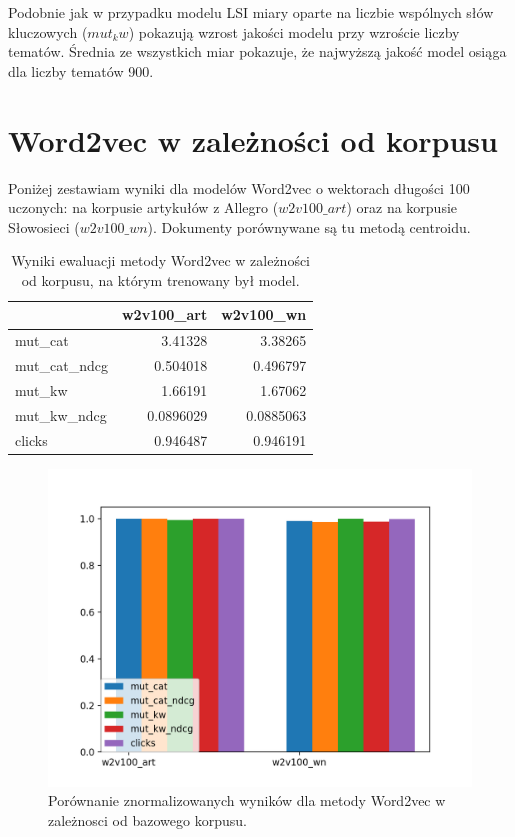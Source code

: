 \documentclass[pl]{minipw} %
\begin{document}
Podobnie jak w przypadku modelu LSI miary oparte na liczbie wspólnych słów kluczowych ($mut_kw$) pokazują wzrost jakości modelu przy wzroście liczby tematów. Średnia ze wszystkich miar pokazuje, że najwyższą jakość model osiąga dla liczby tematów 900.


\section{Word2vec w zależności od korpusu}

Poniżej zestawiam wyniki dla modelów Word2vec o wektorach długości 100 uczonych: na korpusie artykułów z Allegro ($w2v100\_art$) oraz na korpusie Słowosieci ($w2v100\_wn$). Dokumenty porównywane są tu metodą centroidu.

\begin{table}
	\centering
	\begin{tabular}{lrr}
		\hline
		&   w2v100\_art &   w2v100\_wn \\
		\hline
		mut\_cat      &    3.41328   &   3.38265   \\
		mut\_cat\_ndcg &    0.504018  &   0.496797  \\
		mut\_kw       &    1.66191   &   1.67062   \\
		mut\_kw\_ndcg  &    0.0896029 &   0.0885063 \\
		clicks       &    0.946487  &   0.946191  \\
		\hline
	\end{tabular}
	\caption{Wyniki ewaluacji metody Word2vec w zależności od korpusu, na którym trenowany był model.}
\end{table}

\begin{figure}[H]
	\centering
	\includegraphics[width=1\textwidth]{img/results/w2v100_art_w2v100_wn_.png}
	\caption{Porównanie znormalizowanych wyników dla metody Word2vec w zależnosci od bazowego korpusu.}
\end{figure}
\end{document}
